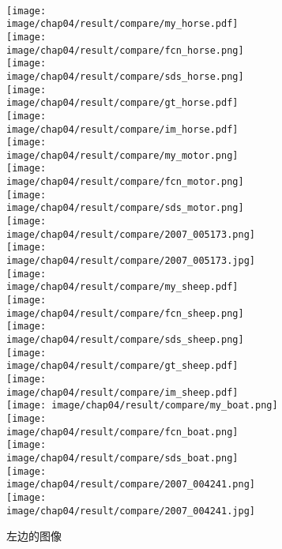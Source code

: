 \begin{figure}[h!] %
    \begin{subfigure}{0.55\textwidth}
         \\
        \texttt{[image: image/chap04/result/compare/my\_horse.pdf]}
        \texttt{[image: image/chap04/result/compare/fcn\_horse.png]}
        \texttt{[image: image/chap04/result/compare/sds\_horse.png]}
        \texttt{[image: image/chap04/result/compare/gt\_horse.pdf]}
        \texttt{[image: image/chap04/result/compare/im\_horse.pdf]}
        \\
        \texttt{[image: image/chap04/result/compare/my\_motor.png]}
        \texttt{[image: image/chap04/result/compare/fcn\_motor.png]}
        \texttt{[image: image/chap04/result/compare/sds\_motor.png]}
        \texttt{[image: image/chap04/result/compare/2007\_005173.png]}
        \texttt{[image: image/chap04/result/compare/2007\_005173.jpg]}
        \\
        \texttt{[image: image/chap04/result/compare/my\_sheep.pdf]}
        \texttt{[image: image/chap04/result/compare/fcn\_sheep.png]}
        \texttt{[image: image/chap04/result/compare/sds\_sheep.png]}
        \texttt{[image: image/chap04/result/compare/gt\_sheep.pdf]}
        \texttt{[image: image/chap04/result/compare/im\_sheep.pdf]}
        \\
        \texttt{[image: image/chap04/result/compare/my\_boat.png]}
        \texttt{[image: image/chap04/result/compare/fcn\_boat.png]}
        \texttt{[image: image/chap04/result/compare/sds\_boat.png]}
        \texttt{[image: image/chap04/result/compare/2007\_004241.png]}
        \texttt{[image: image/chap04/result/compare/2007\_004241.jpg]}
        \caption{左边的图像}
        \label{fig:compare1}
    \end{subfigure}
    \begin{subfigure}{0.4\textwidth}

\end{subfigure}
\end{figure}

